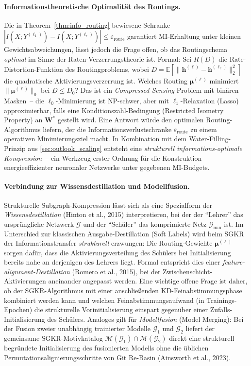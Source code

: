 \documentclass[12pt, a4paper, openany]{report}
\newcommand{\E}{\mathbb{E}}
\newcommand{\calG}{\mathcal{G}}
\newcommand{\calM}{\mathcal{M}}
\begin{document}
\paragraph{Informationstheoretische Optimalität des Routings.}
Die in Theorem~\ref{thm:info_routing} bewiesene Schranke
$|I(X;Y^{(\ell_1)}) - I(X;Y^{(\ell_r)})| \leq \varepsilon_{\mathrm{route}}$
garantiert MI-Erhaltung unter kleinen Gewichtsabweichungen, lässt jedoch
die Frage offen, ob das Routingschema \emph{optimal} im Sinne der
Raten-Verzerrungstheorie ist.  Formal: Sei $R(D)$ die Rate-Distortion-Funktion
des Routingproblems, wobei
$D = \E[\|\bm{h}^{(\ell)} - \bm{h}^{(\ell_r)}\|_2^2]$
die quadratische Aktivierungsverzerrung ist.  Welches Routing $\bm{\mu}^{(\ell)}$
minimiert $\|\bm{\mu}^{(\ell)}\|_0$ bei $D \leq D_0$?  Das ist ein
\emph{Compressed Sensing}-Problem mit binären Masken~-- die $\ell_0$-Minimierung
ist NP-schwer, aber mit $\ell_1$-Relaxation (Lasso) approximierbar, falls
eine Konditionszahl-Bedingung (Restricted Isometry Property) an $\bm{W}^*$
gestellt wird.  Eine Antwort würde den optimalen Routing-Algorithmus liefern,
der die Informationsverlustschranke $\varepsilon_{\mathrm{route}}$ zu einem
operativen Minimierungsziel macht.  In Kombination mit dem
Water-Filling-Prinzip aus \cref{sec:outlook_scaling} entsteht eine
\emph{strukturell informations-optimale Kompression}~-- ein Werkzeug erster
Ordnung für die Konstruktion energieeffizienter neuronaler Netzwerke unter
gegebenen MI-Budgets.

\paragraph{Verbindung zur Wissensdestillation und Modellfusion.}
Strukturelle Subgraph-Kompression lässt sich als eine Spezialform der
\emph{Wissensdestillation} (Hinton et al., 2015) interpretieren, bei der
der ``Lehrer'' das ursprüngliche Netzwerk $\calG$ und der ``Schüler'' das
komprimierte Netz $\calG_{\min}$ ist.  Im Unterschied zur klassischen
Ausgabe-Destillation (Soft Labels) wird beim SGKR der Informationstransfer
\emph{strukturell} erzwungen: Die Routing-Gewichte $\bm{\mu}^{(\ell)}$
sorgen dafür, dass die Aktivierungsverteilung des Schülers bei Initialisierung
bereits nahe an derjenigen des Lehrers liegt.  Formal entspricht dies einer
\emph{feature-alignment-Destillation} (Romero et al., 2015), bei der
Zwischenschicht-Aktivierungen aneinander angepasst werden.  Eine wichtige
offene Frage ist daher, ob der SGKR-Algorithmus mit einer anschließenden
KD-Feinabstimmungsphase kombiniert werden kann und welchen Feinabstimmungs\-aufwand
(in Trainings-Epochen) die strukturelle Vorinitialisierung einspart gegenüber
einer Zufalls-Initialisierung des Schülers.  Analoges gilt für
\emph{Modellfusion} (Model Merging): Bei der Fusion zweier unabhängig
trainierter Modelle $\calG_1$ und $\calG_2$ liefert der gemeinsame
SGKR-Motivkatalog $\calM(\calG_1) \cap \calM(\calG_2)$ direkt eine
strukturell begründete Initialisierung des fusionierten Modells ohne die
üblichen Permutationsalignierungsschritte von Git Re-Basin (Ainsworth
et al., 2023).
\end{document}
